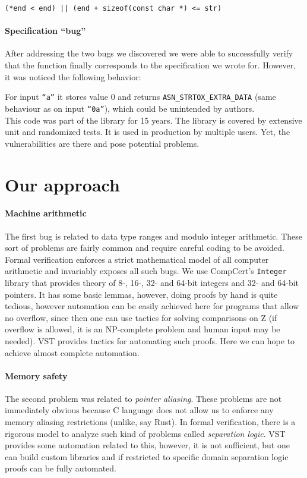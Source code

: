 \documentclass{article}
\begin{document}
{\small
\texttt{(*end < end) || (end + sizeof(const char *) <= str)}}


\paragraph{Specification ``bug''}
After addressing the two bugs we discovered we were able to successfully verify that the function finally corresponds to the specification we wrote for. However, it was noticed the following behavior:

For input \texttt{``a''} it stores value 0 and returns {\color{green}\texttt{ASN\_STRTOX\_EXTRA\_DATA}} (same behaviour as on input \texttt{``0a''}), which could be unintended by authors. \\

This code was part of the library for 15 years. The library is covered by extensive unit and randomized tests. It is used in production by multiple users. Yet, the vulnerabilities are there and pose potential problems.

\section{Our approach}

\paragraph{Machine arithmetic} The first bug is related to data type ranges and modulo integer arithmetic. These sort of problems are fairly common and require careful coding to be avoided. Formal verification enforces a strict mathematical model of all computer arithmetic and invariably exposes all such bugs. We use CompCert's \texttt{Integer} library that provides theory of 8-, 16-, 32- and 64-bit integers and 32- and 64-bit pointers. It has some basic lemmas, however, doing proofs by hand is quite tedious, however automation can be easily achieved here for programs that allow no overflow, since then one can use tactics for solving comparisons on Z (if overflow is allowed, it is an NP-complete problem and human input may be needed). VST provides tactics for automating such proofs. Here we can hope to achieve almost complete automation.

\paragraph{Memory safety} The second problem was related to \textit{pointer aliasing}. These problems are not immediately obvious because C language does not allow us to enforce any memory aliasing restrictions (unlike, say Rust). In formal verification, there is a rigorous model to analyze such kind of problems called \textit{separation logic}. VST provides some automation related to this, however, it is not sufficient, but one can build custom libraries and if restricted to specific domain separation logic proofs can be fully automated.
\end{document}
